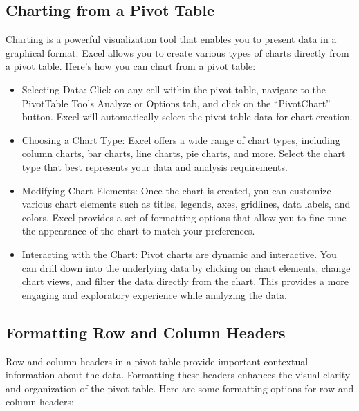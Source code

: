 \documentclass[
]{book}
\begin{document}
\hypertarget{charting-from-a-pivot-table}{%
\subsection{Charting from a Pivot Table}\label{charting-from-a-pivot-table}}

Charting is a powerful visualization tool that enables you to present data in a graphical format. Excel allows you to create various types of charts directly from a pivot table. Here's how you can chart from a pivot table:

\begin{itemize}
\item
  Selecting Data: Click on any cell within the pivot table, navigate to the PivotTable Tools Analyze or Options tab, and click on the ``PivotChart'' button. Excel will automatically select the pivot table data for chart creation.
\item
  Choosing a Chart Type: Excel offers a wide range of chart types, including column charts, bar charts, line charts, pie charts, and more. Select the chart type that best represents your data and analysis requirements.
\item
  Modifying Chart Elements: Once the chart is created, you can customize various chart elements such as titles, legends, axes, gridlines, data labels, and colors. Excel provides a set of formatting options that allow you to fine-tune the appearance of the chart to match your preferences.
\item
  Interacting with the Chart: Pivot charts are dynamic and interactive. You can drill down into the underlying data by clicking on chart elements, change chart views, and filter the data directly from the chart. This provides a more engaging and exploratory experience while analyzing the data.
\end{itemize}

\hypertarget{formatting-row-and-column-headers}{%
\subsection{Formatting Row and Column Headers}\label{formatting-row-and-column-headers}}

Row and column headers in a pivot table provide important contextual information about the data. Formatting these headers enhances the visual clarity and organization of the pivot table. Here are some formatting options for row and column headers:
\end{document}
